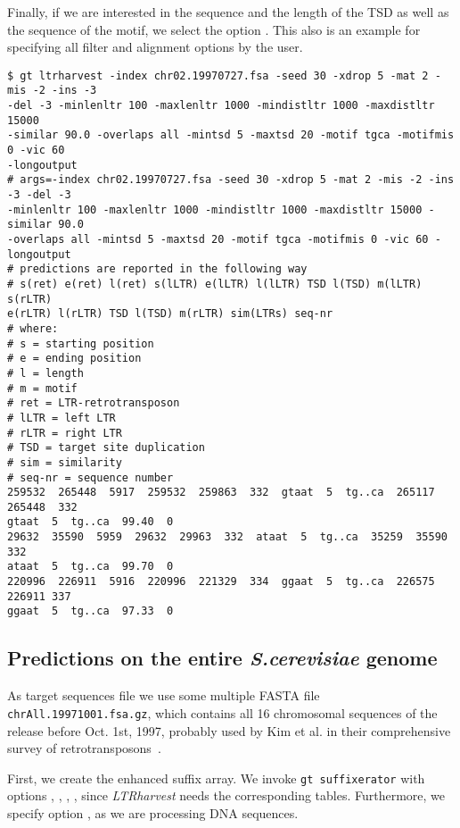 \documentclass[12pt,titlepage]{article}
\newcommand{\LTRharvest}{\textit{LTRharvest}\xspace}
\newcommand{\Gtsuffixerator}{\texttt{gt suffixerator}\xspace}
\begin{document}
Finally, if we are interested in the sequence and the length of the TSD
as well as the sequence of the motif, we select the option
.
This also is an example for specifying all filter and alignment
options by the user.

\begin{footnotesize}
\begin{verbatim}
$ gt ltrharvest -index chr02.19970727.fsa -seed 30 -xdrop 5 -mat 2 -mis -2 -ins -3
-del -3 -minlenltr 100 -maxlenltr 1000 -mindistltr 1000 -maxdistltr 15000
-similar 90.0 -overlaps all -mintsd 5 -maxtsd 20 -motif tgca -motifmis 0 -vic 60
-longoutput
# args=-index chr02.19970727.fsa -seed 30 -xdrop 5 -mat 2 -mis -2 -ins -3 -del -3
-minlenltr 100 -maxlenltr 1000 -mindistltr 1000 -maxdistltr 15000 -similar 90.0
-overlaps all -mintsd 5 -maxtsd 20 -motif tgca -motifmis 0 -vic 60 -longoutput
# predictions are reported in the following way
# s(ret) e(ret) l(ret) s(lLTR) e(lLTR) l(lLTR) TSD l(TSD) m(lLTR) s(rLTR)
e(rLTR) l(rLTR) TSD l(TSD) m(rLTR) sim(LTRs) seq-nr
# where:
# s = starting position
# e = ending position
# l = length
# m = motif
# ret = LTR-retrotransposon
# lLTR = left LTR
# rLTR = right LTR
# TSD = target site duplication
# sim = similarity
# seq-nr = sequence number
259532  265448  5917  259532  259863  332  gtaat  5  tg..ca  265117  265448  332
gtaat  5  tg..ca  99.40  0
29632  35590  5959  29632  29963  332  ataat  5  tg..ca  35259  35590  332
ataat  5  tg..ca  99.70  0
220996  226911  5916  220996  221329  334  ggaat  5  tg..ca  226575  226911 337
ggaat  5  tg..ca  97.33  0
\end{verbatim}
\end{footnotesize}

\subsection{Predictions on the entire \textit{S.cerevisiae} genome}
\label{Example-genome}

As target sequences file we use some multiple FASTA file
\texttt{\small{chrAll.19971001.fsa.gz}}, which contains all 16
chromosomal sequences of the release before Oct. 1st, 1997, probably
used by Kim et al.
in their comprehensive survey of retrotransposons~\cite{kim:1998}.

First, we create the enhanced suffix array.
We invoke \Gtsuffixerator with options ,
, , , since
\LTRharvest needs the corresponding tables. Furthermore, we specify option
, as we are processing DNA sequences.
\end{document}
